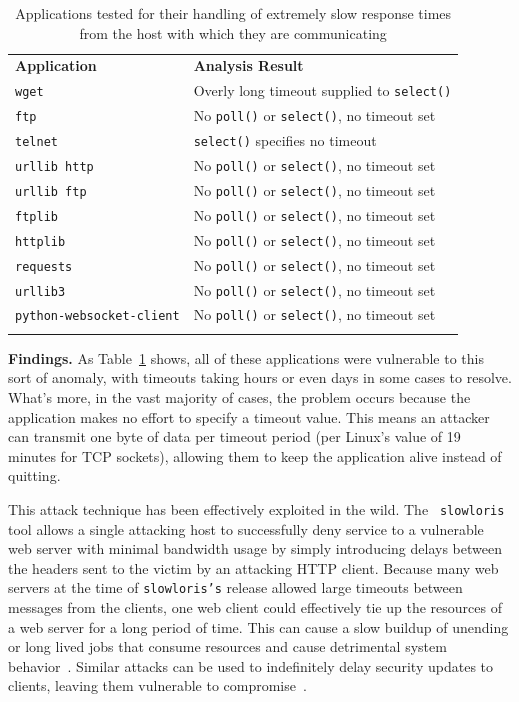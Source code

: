 \begin{table}[t]
  \scriptsize{}
  \begin{tabular}{l | l}
    \toprule{}
    {\bf Application}              & {\bf Analysis Result}\\
    {\tt wget}                     & Overly long timeout supplied to {\tt select()} \\
    {\tt ftp}                      & No {\tt poll()} or {\tt select()}, no timeout set \\
    {\tt telnet}                   & {\tt select()} specifies no timeout \\
    {\tt urllib http}              & No {\tt poll()} or {\tt select()}, no timeout set \\
    {\tt urllib ftp}               & No {\tt poll()} or {\tt select()}, no timeout set \\
    {\tt ftplib}                   & No {\tt poll()} or {\tt select()}, no timeout set \\
    {\tt httplib}                  & No {\tt poll()} or {\tt select()}, no timeout set \\
    {\tt requests}                 & No {\tt poll()} or {\tt select()}, no timeout set \\
    {\tt urllib3}                  & No {\tt poll()} or {\tt select()}, no timeout set \\
    {\tt python-websocket-client}  & No {\tt poll()} or {\tt select()}, no timeout set \\
    \bottomrule{}
  \end{tabular}
  \caption{Applications tested for their handling of extremely slow response
    times from the host with which they are communicating }
  \label{table:slowloris}
\end{table}


{\bf Findings.} As Table~\ref{table:slowloris} shows, all of these
applications were vulnerable to this sort of anomaly, with timeouts taking
hours or even days in some cases to resolve.
What's more, in the vast majority of
cases, the problem occurs because the application makes no effort to
specify a timeout value.  This means an attacker can transmit one byte of
data per timeout period (per Linux's value of 19 minutes for TCP sockets),
allowing them to keep the application alive instead of quitting.


This attack technique has been effectively exploited in the wild.  The {\tt
slowloris} tool allows a single attacking host to successfully deny service
to a vulnerable web server with minimal bandwidth usage by simply
introducing delays between the headers sent to the victim by an attacking
HTTP client.  Because many web servers at the time  of {\tt slowloris's} release
allowed large timeouts
between messages from the clients, one web client could effectively tie up
the resources of a web server for a long period of time.
This can cause a slow buildup of unending or long lived jobs that consume
resources and cause detrimental system behavior~\cite{Slowloris}.
Similar attacks can be used to indefinitely delay security updates to
clients, leaving them vulnerable to compromise~\cite{Cappos_TR_08}.

